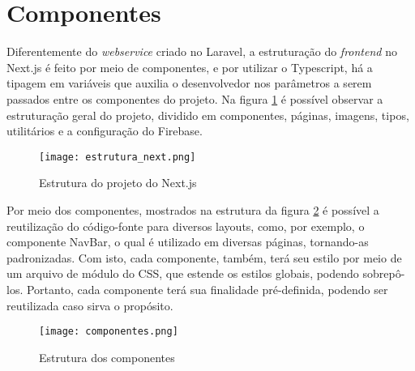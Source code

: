 \section{Componentes}
Diferentemente do \textit{webservice} criado no Laravel, a estruturação do \textit{frontend} no Next.js é feito por meio de componentes, e por utilizar o Typescript, há a tipagem em variáveis que auxilia o desenvolvedor nos parâmetros a serem passados entre os componentes do projeto. Na figura \ref{estrutura_next} é possível observar a estruturação geral do projeto, dividido em componentes, páginas, imagens, tipos, utilitários e a configuração do Firebase.
\begin{figure}[H]
    \caption{\label{estrutura_next}Estrutura do projeto do Next.js}
    \vspace{5pt}
    \centering
    \texttt{[image: estrutura\_next.png]}
    \vspace{5pt}
\end{figure}

Por meio dos componentes, mostrados na estrutura da figura \ref{componentes} é possível a reutilização do código-fonte para diversos layouts, como, por exemplo, o componente NavBar, o qual é utilizado em diversas páginas, tornando-as padronizadas. Com isto, cada componente, também, terá seu estilo por meio de um arquivo de módulo do CSS, que estende os estilos globais, podendo sobrepô-los. Portanto, cada componente terá sua finalidade pré-definida, podendo ser reutilizada caso sirva o propósito.

\begin{figure}[H]
    \caption{\label{componentes}Estrutura dos componentes}
    \vspace{5pt}
    \centering
    \texttt{[image: componentes.png]}
    \vspace{5pt}
\end{figure}

